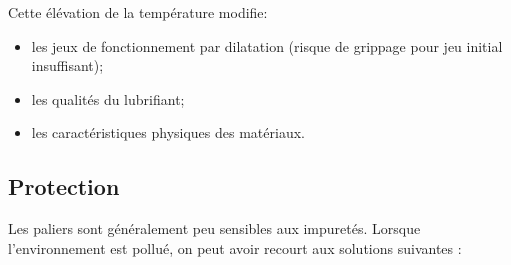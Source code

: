 \documentclass[11pt,oneside]{article}
\begin{document}
Cette élévation de la température modifie: 
\begin{itemize}
\item les jeux de fonctionnement par dilatation (risque de grippage pour jeu initial insuffisant);
\item les qualités du lubrifiant;
\item les caractéristiques physiques des matériaux. 
\end{itemize}

\subsection{Protection}
Les paliers sont généralement peu sensibles aux impuretés. Lorsque l'environnement est pollué, on peut avoir recourt aux solutions suivantes : 
 
\end{document}
